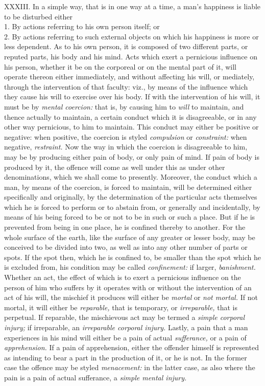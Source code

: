 \documentclass[12pt]{report}
\begin{document}
XXXIII. In a simple way, that is in one way at a time, a man's happiness
is liable to be disturbed either\\
1. By actions referring to his own person itself; or\\
2. By actions referring to such external objects on which his happiness
is more or less dependent. As to his own person, it is composed of two
different parts, or reputed parts, his body and his mind. Acts which
exert a pernicious influence on his person, whether it be on the
corporeal or on the mental part of it, will operate thereon either
immediately, and without affecting his will, or mediately, through the
intervention of that faculty: viz., by means of the influence which they
cause his will to exercise over his body. If with the intervention of
his will, it must be by \emph{mental coercion:} that is, by causing him
to \emph{will} to maintain, and thence actually to maintain, a certain
conduct which it is disagreeable, or in any other way pernicious, to him
to maintain. This conduct may either be positive or negative: when
positive, the coercion is styled \emph{compulsion} or \emph{constraint:}
when negative, \emph{restraint.} Now the way in which the coercion is
disagreeable to him, may be by producing either pain of body, or only
pain of mind. If pain of body is produced by it, the offence will come
as well under this as under other denominations, which we shall come to
presently. Moreover, the conduct which a man, by means of the coercion,
is forced to maintain, will be determined either specifically and
originally, by the determination of the particular acts themselves which
he is forced to perform or to abstain from, or generally and
incidentally, by means of his being forced to be or not to be in such or
such a place. But if he is prevented from being in one place, he is
confined thereby to another. For the whole surface of the earth, like
the surface of any greater or lesser body, may be conceived to be
divided into two, as well as into any other number of parts or spots. If
the spot then, which he is confined to, be smaller than the spot which
he is excluded from, his condition may be called \emph{confinement:} if
larger, \emph{banishment.} Whether an act, the effect of which is to
exert a pernicious influence on the person of him who suffers by it
operates with or without the intervention of an act of his will, the
mischief it produces will either be \emph{mortal} or \emph{not mortal.}
If not mortal, it will either be \emph{reparable,} that is temporary, or
\emph{irreparable,} that is perpetual. If reparable, the mischievous act
may be termed a \emph{simple corporal injury;} if irreparable, an
\emph{irreparable corporal injury.} Lastly, a pain that a man
experiences in his mind will either be a pain of actual
\emph{sufferance,} or a pain of \emph{apprehension.} If a pain of
apprehension, either the offender himself is represented as intending to
bear a part in the production of it, or he is not. In the former case
the offence may be styled \emph{menacement:} in the latter case, as also
where the pain is a pain of actual sufferance, a \emph{simple mental
injury.}
\end{document}
